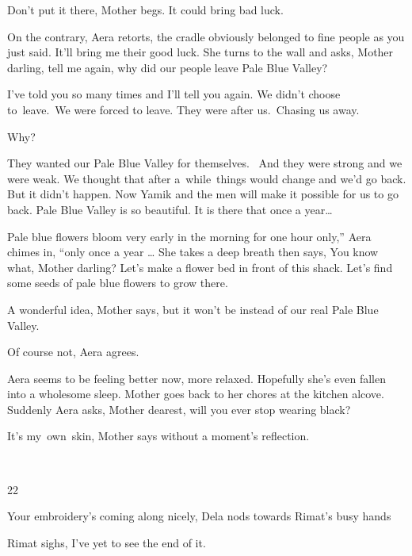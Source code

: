 \documentclass[twoside,11pt]{book}
\begin{document}
{\textquotedbl}Don't put it there,{\textquotedbl} Mother begs. {\textquotedbl}It could bring bad luck.{\textquotedbl} 

{\textquotedbl}On the contrary,{\textquotedbl} Aera retorts, {\textquotedbl}the cradle obviously belonged to fine people
as you just said. It'll bring me their good luck.{\textquotedbl} She turns to the wall and asks, {\textquotedbl}Mother
darling, tell me again, why did our people leave Pale Blue Valley?{\textquotedbl} 

{\textquotedbl}I've told you so many times and I'll tell you again. We didn't choose to\ leave.\ We were forced to
leave. They were after us.\ Chasing us away.{\textquotedbl} 

{\textquotedbl}Why?{\textquotedbl} 

{\textquotedbl}They wanted our Pale Blue Valley for themselves. ~And they were strong and we were weak. We thought that
after  a\ while\ things would change and we'd go back. But it didn't happen. Now Yamik and the men will make it
possible for us to go back. Pale Blue Valley is so beautiful. It is there that once a year{\dots} {\textquotedbl} 

 {\textquotedbl}Pale blue flowers bloom very early in the morning for one hour only,'' Aera chimes in, ``only once a
year {\dots}{\textquotedbl} She takes a deep breath then says, {\textquotedbl}You know what, Mother darling? Let's make
a flower bed in front of this shack. Let's find some seeds of pale blue flowers to grow there.{\textquotedbl}

{\textquotedbl}A wonderful idea,{\textquotedbl} Mother says,{\textquotedbl} but it won't be instead of our real Pale
Blue Valley.{\textquotedbl}\ 

{\textquotedbl}Of course not,{\textquotedbl} Aera agrees.

 Aera seems to be feeling better now, more relaxed. Hopefully she's even fallen into a wholesome sleep. Mother goes back
to her chores at the kitchen alcove. Suddenly Aera asks, {\textquotedbl}Mother dearest, will you ever stop wearing
black?{\textquotedbl} 

{\textquotedbl}It's my{\ }own\ skin,{\textquotedbl} Mother says without a moment's reflection. 

~

22~~

{\textquotedbl}Your embroidery's coming along nicely,{\textquotedbl} Dela nods towards Rimat's busy hands

Rimat sighs, {\textquotedbl}I've yet to see the end of it.{\textquotedbl} 
\end{document}
